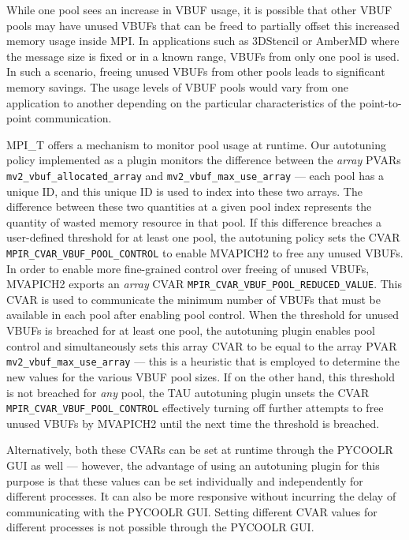 \par While one pool sees an increase in VBUF usage, it is possible that other VBUF pools may have unused VBUFs that can be freed to partially offset this increased memory usage inside MPI. In applications such as 3DStencil or AmberMD where the message size is fixed or in a known range, VBUFs from only one pool is used. In such a scenario, freeing unused VBUFs from other pools leads to significant memory savings. The usage levels of VBUF pools would vary from one application to another depending on the particular characteristics of the point-to-point communication. \par
MPI\_T offers a mechanism to monitor pool usage at runtime. Our autotuning policy implemented as a plugin monitors the difference between the \textit{array} PVARs \verb+mv2_vbuf_allocated_array+ and \verb+mv2_vbuf_max_use_array+ --- each pool has a unique ID, and this unique ID is used to index into these two arrays. The difference between these two quantities at a given pool index represents the quantity of wasted memory resource in that pool. If this difference breaches a user-defined threshold for at least one pool, the autotuning policy sets the CVAR \verb+MPIR_CVAR_VBUF_POOL_CONTROL+ to enable MVAPICH2 to free any unused VBUFs. In order to enable more fine-grained control over freeing of unused VBUFs, MVAPICH2 exports an \textit{array} CVAR \verb+MPIR_CVAR_VBUF_POOL_REDUCED_VALUE+. This CVAR is used to communicate the minimum number of VBUFs that must be available in each pool after enabling pool control. When the threshold for unused VBUFs is breached for at least one pool, the autotuning plugin enables pool control and simultaneously sets this array CVAR to be equal to the array PVAR \verb+mv2_vbuf_max_use_array+ --- this is a heuristic that is employed to determine the new values for the various VBUF pool sizes. If on the other hand, this threshold is not breached for \textit{any} pool, the TAU autotuning plugin unsets the CVAR \verb+MPIR_CVAR_VBUF_POOL_CONTROL+ effectively turning off further attempts to free unused VBUFs by MVAPICH2 until the next time the threshold is breached.\par 
Alternatively, both these CVARs can be set at runtime through the PYCOOLR GUI as well --- however, the advantage of using an autotuning plugin for this purpose is that these values can be set individually and independently for different processes. It can also be more responsive without incurring the delay of communicating with the PYCOOLR GUI. Setting different CVAR values for different processes is not possible through the PYCOOLR GUI. \par 
